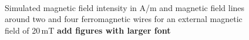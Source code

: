\begin{figure}[H]
            \begin{subfigure}{0.49\textwidth}
                  \flushleft
          \end{subfigure}\hfill
        \begin{subfigure}{0.49\textwidth}
                \flushright
        \end{subfigure}
        \\
        
        \caption[Simulated magnetic field intensity around two and four wires]{Simulated magnetic field intensity in A/m and magnetic field lines around two and four ferromagnetic wires for an external magnetic field of 20\,mT \textbf{add figures with larger font}}
        \label{fig:tw_fw_mag_field}
  \end{figure}

